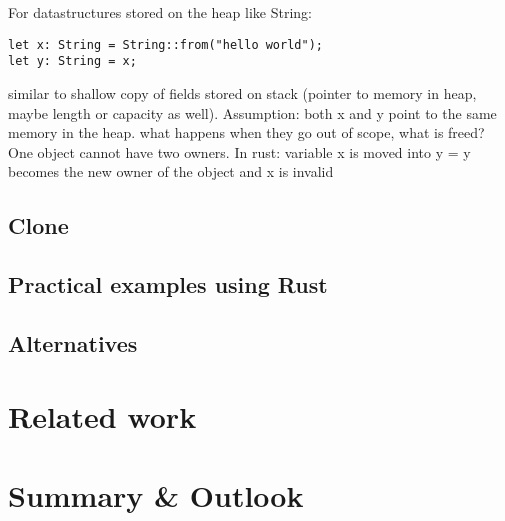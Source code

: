 \documentclass[sigplan,11pt,nonacm]{acmart}
\begin{document}
For datastructures stored on the heap like String:

\begin{lstlisting}
let x: String = String::from("hello world");
let y: String = x;
\end{lstlisting}

similar to shallow copy of fields stored on stack (pointer to memory in heap, maybe length or capacity as well).
Assumption: both x and y point to the same memory in the heap.
what happens when they go out of scope, what is freed?
One object cannot have two owners.
In rust: variable x is moved into y = y becomes the new owner of the object and x is invalid

\subsection{Clone}





\subsection{Practical examples using Rust}


\subsection{Alternatives}


\section{Related work}
\label{sec:relatedwork}


\section{Summary \& Outlook}
\label{sec:summary}





\end{document}

